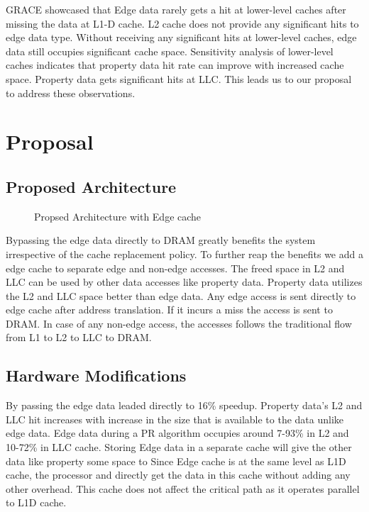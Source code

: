 \documentclass[a4paper,12pt, final]{report}
\begin{document}
GRACE\cite{grace} showcased that Edge data rarely gets a hit at lower-level caches after missing the data at L1-D cache. L2 cache does not provide any significant hits to edge data type. Without receiving any significant hits at lower-level caches, edge data still occupies
significant cache space. Sensitivity analysis of lower-level caches indicates that property data hit rate can improve with increased cache space. Property data gets significant hits at LLC. This leads us to our proposal to address these observations.

\chapter{Proposal}\label{chap:proposal}
\section{Proposed Architecture}
\begin{figure}[h]
    \centering
    
    \caption{Propsed Architecture with Edge cache}
    \label{fig:propsedArch}
\end{figure}



Bypassing the edge data directly to DRAM greatly benefits the system irrespective of the cache replacement policy. To further reap the benefits we add a edge cache to separate edge and non-edge accesses. The freed space in L2 and LLC can be used by other data accesses like property data. Property data utilizes the L2 and LLC space better than edge data. Any edge access is sent directly to edge cache after address translation. If it incurs a miss the access is sent to DRAM. In case of any non-edge access, the accesses follows the traditional flow from L1 to L2 to LLC to DRAM. 


\section{Hardware Modifications}
By passing the edge data leaded directly to 16\% speedup. Property data's L2 and LLC hit increases with increase in the size that is available to the data unlike edge data. Edge data during a PR algorithm occupies around 7-93\% in L2 and 10-72\% in LLC cache. Storing Edge data in a separate cache will give the other data like property some space to \cite{grace}
Since Edge cache is at the same level as L1D cache, the processor and directly get the data in this cache without adding any other overhead. This cache does not affect the critical path as it operates parallel to L1D cache.
\end{document}
